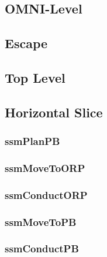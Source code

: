 \documentclass[../../main/main.tex]{subfiles}
\begin{document}
\subsection{OMNI-Level}

\subsection{Escape}

\subsection{Top Level}

\subsection{Horizontal Slice}

\subsubsection{ssmPlanPB}

\subsubsection{ssmMoveToORP}

\subsubsection{ssmConductORP}

\subsubsection{ssmMoveToPB}

\subsubsection{ssmConductPB}
\end{document}
